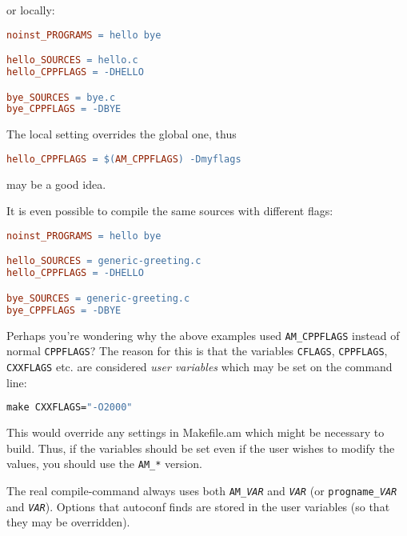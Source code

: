 \documentclass[11pt,a4paper,headinclude,footinclude,DIV16,normalheadings]{scrartcl}
\begin{document}
or locally:

\begin{lstlisting}[language=make]
noinst_PROGRAMS = hello bye

hello_SOURCES = hello.c
hello_CPPFLAGS = -DHELLO

bye_SOURCES = bye.c
bye_CPPFLAGS = -DBYE
\end{lstlisting}

The local setting overrides the global one, thus

\begin{lstlisting}[language=make]
hello_CPPFLAGS = $(AM_CPPFLAGS) -Dmyflags
\end{lstlisting}

may be a good idea.

It is even possible to compile the same sources with different flags:

\begin{lstlisting}[language=make]
noinst_PROGRAMS = hello bye

hello_SOURCES = generic-greeting.c
hello_CPPFLAGS = -DHELLO

bye_SOURCES = generic-greeting.c
bye_CPPFLAGS = -DBYE
\end{lstlisting}

Perhaps you're wondering why the above examples used
\texttt{AM\_CPPFLAGS} instead of normal \texttt{CPPFLAGS}? The
reason for this is that the variables \texttt{CFLAGS},
\texttt{CPPFLAGS}, \texttt{CXXFLAGS} etc. are considered {\em user
  variables} which may be set on the command line:

\begin{lstlisting}[language=make]
make CXXFLAGS="-O2000"
\end{lstlisting}

This would override any settings in Makefile.am which might be
necessary to build. Thus, if the variables should be set even if the
user wishes to modify the values, you should use the \texttt{AM\_*}
version. 

The real compile-command always uses both \texttt{AM\_\textit{VAR}} and
\texttt{\textit{VAR}} (or \texttt{\texttt{progname}\_\textit{VAR}} and
\texttt{\textit{VAR}}).  Options that
autoconf finds are stored in the user variables (so that they may be
overridden).
\end{document}
